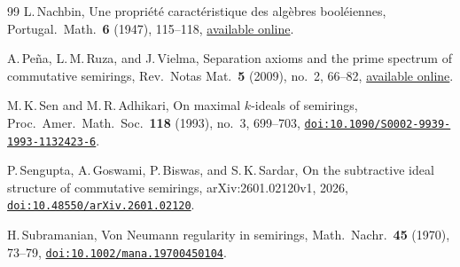 \documentclass[11pt,leqno]{amsart}
\theoremstyle{plain}
\theoremstyle{definition}
\theoremstyle{remark}
\numberwithin{equation}{section}
\newcommand{\doi}[1]{\href{https://doi.org/#1}{\nolinkurl{doi:#1}}}
\begin{document}
\begin{thebibliography}{99}
L.\,Nachbin,
Une propri\'et\'e caract\'eristique des alg\`ebres bool\'eiennes,
Portugal.\ Math.\ \textbf{6} (1947), 115--118,
\href{https://purl.pt/2164}{available online}.

A.\,Pe\~na, L.\,M.\,Ruza, and J.\,Vielma,
Separation axioms and the prime spectrum of commutative semirings,
Rev.\ Notas Mat.\ \textbf{5} (2009), no.~2, 66--82,
\href{https://saber.ula.ve/handle/123456789/31986}{available online}.

M.\,K.\,Sen and M.\,R.\,Adhikari,
On maximal $k$-ideals of semirings,
Proc.\ Amer.\ Math.\ Soc.\ \textbf{118} (1993), no.~3, 699--703,
\doi{10.1090/S0002-9939-1993-1132423-6}.

P.\,Sengupta, A.\,Goswami, P.\,Biswas, and S.\,K.\,Sardar,
On the subtractive ideal structure of commutative semirings,
arXiv:2601.02120v1, 2026,
\doi{10.48550/arXiv.2601.02120}.

H.\,Subramanian,
Von Neumann regularity in semirings,
Math.\ Nachr.\ \textbf{45} (1970), 73--79,
\doi{10.1002/mana.19700450104}.

\end{thebibliography}
\end{document}
